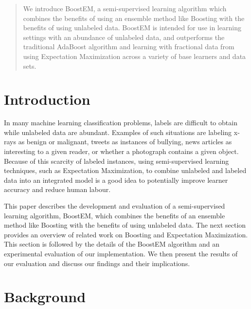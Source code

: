 \documentclass{sig-alternate}
\begin{document}
\maketitle
\begin{abstract}
We introduce BoostEM, a semi-supervised learning algorithm which combines the benefits of using an ensemble method like Boosting with the benefits of using unlabeled data.  BoostEM is intended for use in learning settings with an abundance of unlabeled data, and outperforms the traditional AdaBoost algorithm and learning with fractional data from using Expectation Maximization across a variety of base learners and data sets.
\end{abstract}

\section{Introduction}

In many machine learning classification problems, labels are difficult to obtain while unlabeled data are abundant. Examples of such situations are labeling x-rays as benign or malignant, tweets as instances of bullying, news articles as interesting to a given reader, or whether a photograph contains a given object. Because of this scarcity of labeled instances, using semi-supervised learning techniques, such as Expectation Maximization, to combine unlabeled and labeled data into an integrated model is a good idea to potentially improve learner accuracy and reduce human labour.

This paper describes the development and evaluation of a semi-supervised learning algorithm, BoostEM, which combines the benefits of an ensemble method like Boosting with the benefits of using unlabeled data. The next section provides an overview of related work on Boosting and Expectation Maximization. This section is followed by the details of the BoostEM algorithm and an experimental evaluation of our implementation. We then present the results of our evaluation and discuss our findings and their implications.

\section{Background}
\end{document}
